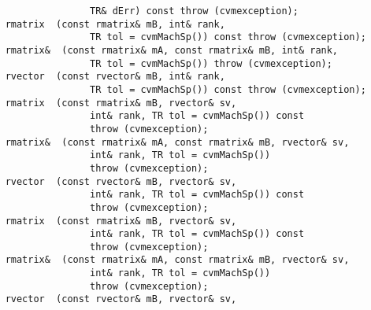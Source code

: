 \verb"                   TR& dErr) const throw (cvmexception);"\\
\verb"    rmatrix "\verb" (const rmatrix& mB, int& rank,"\\
\verb"                   TR tol = cvmMachSp()) const throw (cvmexception);"\\
\verb"    rmatrix& "\verb" (const rmatrix& mA, const rmatrix& mB, int& rank,"\\
\verb"                   TR tol = cvmMachSp()) throw (cvmexception);"\\
\verb"    rvector "\verb" (const rvector& mB, int& rank,"\\
\verb"                   TR tol = cvmMachSp()) const throw (cvmexception);"\\
\verb"    rmatrix "\verb" (const rmatrix& mB, rvector& sv,"\\
\verb"                   int& rank, TR tol = cvmMachSp()) const"\\
\verb"                   throw (cvmexception);"\\
\verb"    rmatrix& "\verb" (const rmatrix& mA, const rmatrix& mB, rvector& sv,"\\
\verb"                   int& rank, TR tol = cvmMachSp())"\\
\verb"                   throw (cvmexception);"\\
\verb"    rvector "\verb" (const rvector& mB, rvector& sv,"\\
\verb"                   int& rank, TR tol = cvmMachSp()) const"\\
\verb"                   throw (cvmexception);"\\
\verb"    rmatrix "\verb" (const rmatrix& mB, rvector& sv,"\\
\verb"                   int& rank, TR tol = cvmMachSp()) const"\\
\verb"                   throw (cvmexception);"\\
\verb"    rmatrix& "\verb" (const rmatrix& mA, const rmatrix& mB, rvector& sv,"\\
\verb"                   int& rank, TR tol = cvmMachSp())"\\
\verb"                   throw (cvmexception);"\\
\verb"    rvector "\verb" (const rvector& mB, rvector& sv,"\\
